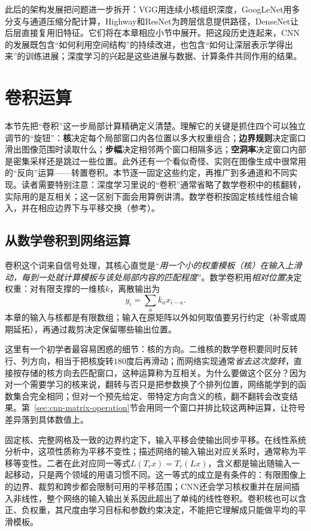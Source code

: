 此后的架构发展把问题进一步拆开：VGG用连续小核组织深度，GoogLeNet用多分支与通道压缩分配计算，Highway和ResNet为跨层信息提供路径，DenseNet让后层直接复用旧特征。它们将在本章相应小节中展开。把这段历史连起来，CNN的发展既包含“如何利用空间结构”的持续改进，也包含“如何让深层表示学得出来”的训练进展；深度学习的兴起是这些进展与数据、计算条件共同作用的结果。

\section{卷积运算}
\label{sec:cnn-convolution}

本节先把“卷积”这一步局部计算精确定义清楚。理解它的关键是抓住四个可以独立调节的“旋钮”：\textbf{核}决定每个局部窗口内各位置以多大权重组合；\textbf{边界规则}决定窗口滑出图像范围时读取什么；\textbf{步幅}决定相邻两个窗口相隔多远；\textbf{空洞率}决定窗口内部是密集采样还是跳过一些位置。此外还有一个看似奇怪、实则在图像生成中很常用的“反向”运算——转置卷积。本节逐一固定这些约定，再推广到多通道和不同实现。读者需要特别注意：深度学习里说的“卷积”通常省略了数学卷积中的核翻转，实际用的是互相关；这一区别下面会用算例讲清。数学卷积按固定核线性组合输入，并在相应边界下与平移交换（参考）。

\subsection{从数学卷积到网络运算}
\label{sec:cnn-convolution-definition}

卷积这个词来自信号处理，其核心直觉是“\emph{用一个小的权重模板（核）在输入上滑动，每到一处就计算模板与该处局部内容的匹配程度}”。数学卷积用\emph{相对位置}决定权重：对有限支撑的一维核$k$，离散输出为
\[
  y_i=\sum_a k_a x_{i-a}.
\]
本章的输入与核都是有限数组；输入在原矩阵以外如何取值要另行约定（补零或周期延拓），再通过裁剪决定保留哪些输出位置。

这里有一个初学者最容易困惑的细节：核的方向。二维核的数学卷积要同时反转行、列方向，相当于把核旋转$180$度后再滑动；而网络实现通常\emph{省去这次旋转}，直接按存储的核方向去匹配窗口，这种运算称为互相关。为什么要做这个区分？因为对一个需要学习的核来说，翻转与否只是把参数换了个排列位置，网络能学到的函数集合完全相同；但对一个预先给定、带特定方向含义的核，翻不翻转会改变结果。第~\ref{sec:cnn-matrix-operation}节会用同一个窗口并排比较这两种运算，让符号差异落到具体数值上。

固定核、完整网格及一致的边界约定下，输入平移会使输出同步平移。在线性系统分析中，这项性质称为平移不变性；描述网络的输入输出对应关系时，通常称为平移等变性。二者在此对应同一等式$L(T_rx)=T_r(Lx)$，含义都是输出随输入一起移动，只是两个领域的用语习惯不同。这一等式的成立是有条件的：有限图像上的边界、裁剪和跨步都会限制可用的平移范围；CNN还会学习核权重并在层间插入非线性，整个网络的输入输出关系因此超出了单纯的线性卷积。卷积核也可以含正、负权重，其尺度由学习目标和参数约束决定，不能把它理解成只能做平均的平滑模板。

